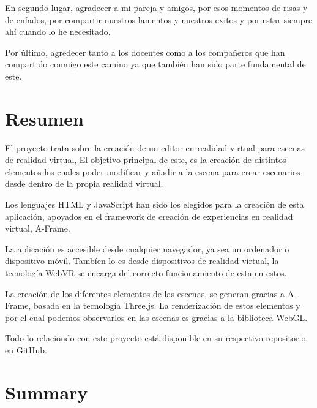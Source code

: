 \documentclass[a4paper, 12pt]{book}
\begin{document}
En segundo lugar, agradecer a mi pareja y amigos, por esos  momentos de risas y de enfados, por compartir nuestros lamentos y nuestros exitos y por estar siempre ahí cuando lo he necesitado.

Por último, agredecer tanto a los docentes como a los compañeros que han compartido conmigo este camino ya que también han sido parte fundamental de este.


\chapter*{Resumen}

El proyecto trata sobre la creación de un editor en realidad virtual para escenas de realidad virtual, El objetivo principal de este, es la creación de distintos elementos los cuales poder modificar y añadir a la escena para crear escenarios desde dentro de la propia realidad virtual.

Los lenguajes HTML y JavaScript han sido los elegidos para la creación de esta aplicación, apoyados en el framework de creación de experiencias en realidad virtual, A-Frame.

La aplicación es accesible desde cualquier navegador, ya sea un ordenador o dispositivo móvil. Tambíen lo es desde dispositivos de realidad virtual, la tecnología WebVR se encarga del correcto funcionamiento de esta en estos.

La creación de los diferentes elementos de las escenas, se generan gracias a A-Frame, basada en la tecnología Three.js. La renderización de estos elementos y por el cual podemos observarlos en las escenas es gracias a la biblioteca WebGL.

Todo lo relaciondo con este proyecto está disponible en su respectivo repositorio en GitHub.



\chapter*{Summary}
\end{document}
